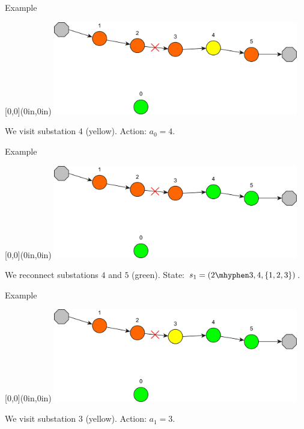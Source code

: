\documentclass[10pt, aspectratio=169, compress, protectframetitle, handout]{beamer}
\begin{document}
\begin{frame}{Example}

    \begin{textblock*}{\textwidth}[0,0](0in,0in)
        \centering
        \includegraphics[width=0.8\textwidth]{figures/MDP_1.pdf}
    \end{textblock*}
    
    \vspace*{5cm}
    We visit substation $4$ (yellow). Action: $a_0 = 4$.
    
\end{frame}

\begin{frame}{Example}

    \begin{textblock*}{\textwidth}[0,0](0in,0in)
        \centering
        \includegraphics[width=0.8\textwidth]{figures/MDP_2.pdf}
    \end{textblock*}
    
    \vspace*{5cm}
    We reconnect substations $4$ and $5$ (green). State: $s_1 = (2 \mhyphen 3, 4, \{1,2,3\})$.
    
\end{frame}

\begin{frame}{Example}

    \begin{textblock*}{\textwidth}[0,0](0in,0in)
        \centering
        \includegraphics[width=0.8\textwidth]{figures/MDP_3.pdf}
    \end{textblock*}
    
    \vspace*{5cm}
    We visit substation $3$ (yellow). Action: $a_1 = 3$.
    
\end{frame}
\end{document}
